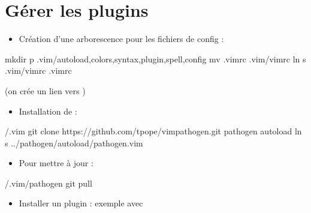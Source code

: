 \documentclass[letterpaper,10pt,french]{sphinxmanual}
\begin{document}
\section{Gérer les plugins}
\label{\detokenize{20-vim:gerer-les-plugins}}
\begin{itemize}
\item {} 
Création d’une arborescence pour les fichiers de config :

\end{itemize}

%
\begin{sphinxVerbatim}[commandchars=\\\{\}]
\PYGZdl{} 
\PYGZdl{} mkdir \PYGZhy{}p .vim/autoload,colors,syntax,plugin,spell,config
\PYGZdl{} mv .vimrc .vim/vimrc
\PYGZdl{} ln \PYGZhy{}s .vim/vimrc .vimrc
\end{sphinxVerbatim}

(on crée un lien vers )
\begin{itemize}
\item {} 
Installation de  :

\end{itemize}

%
\begin{sphinxVerbatim}[commandchars=\\\{\}]
\PYGZdl{}  \PYGZti{}/.vim
\PYGZdl{} git clone https://github.com/tpope/vim\PYGZhy{}pathogen.git pathogen
\PYGZdl{}  autoload
\PYGZdl{} ln \PYGZhy{}s ../pathogen/autoload/pathogen.vim
\end{sphinxVerbatim}
\begin{itemize}
\item {} 
Pour mettre à jour  :

\end{itemize}

%
\begin{sphinxVerbatim}[commandchars=\\\{\}]
\PYGZdl{}  \PYGZti{}/.vim/pathogen
\PYGZdl{} git pull
\end{sphinxVerbatim}
\begin{itemize}
\item {} 
Installer un plugin : exemple avec 

\end{itemize}
\end{document}
